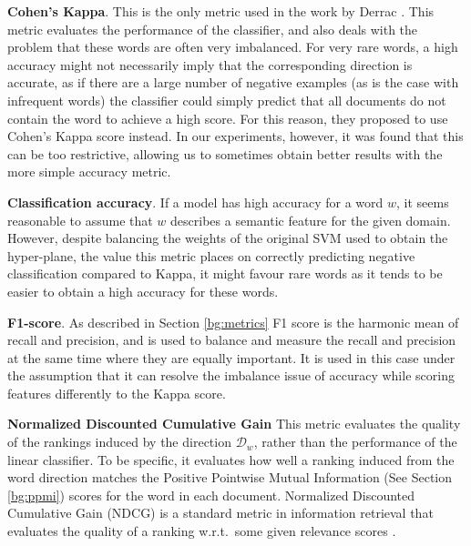 
\noindent

\noindent \textbf{Cohen's Kappa}. This is the only metric used in the work by Derrac \cite{Derrac2015}. This metric evaluates the performance of the classifier, and also deals with the problem that these words are often very imbalanced. For very rare words, a high accuracy might not necessarily imply that the corresponding direction is accurate, as if there are a large number of negative examples (as is the case with infrequent words) the classifier could simply predict that all documents do not contain the word to achieve a high score. For this reason, they proposed to use Cohen's Kappa score instead. In our experiments, however, it was found that this can be too restrictive, allowing us to sometimes obtain better results with the more simple accuracy metric.\smallskip %
\smallskip

 \textbf{Classification accuracy}. If a model has high accuracy for a word $w$, it seems reasonable to assume that $w$ describes a semantic feature for the given domain. However, despite balancing the weights of the original SVM used to obtain the hyper-plane, the value this metric places on correctly predicting negative classification  compared to Kappa, it might favour rare words as it tends to be easier to obtain a high accuracy for these words.%
\smallskip

\textbf{F1-score}. As described in Section \ref{bg:metrics} F1 score is the harmonic mean of recall and precision, and is used to balance and measure the recall and precision at the same time where they are equally important. It is used in this case under the assumption that it can resolve the imbalance issue of accuracy while scoring features differently to the Kappa score. 

\noindent \textbf{Normalized Discounted Cumulative Gain}\label{ch3:NDCG} %
This metric evaluates the quality of the rankings induced by the direction $\mathcal{D}_w$, rather than the performance of the linear classifier. To be specific, it evaluates how well a ranking induced from the word direction matches the Positive Pointwise Mutual Information (See Section \ref{bg:ppmi}) scores for the word in each document.  Normalized Discounted Cumulative Gain (NDCG) is a standard metric in information retrieval that evaluates the quality of a ranking w.r.t.\ some given relevance scores \cite{jarvelin2002cumulated}.  

